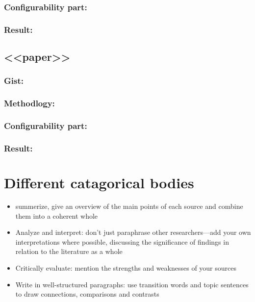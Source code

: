 \documentclass[	runningheads,
				a4paper]{llncs}
\begin{document}
\subsubsection{Configurability part:}

\subsubsection{Result:}


\subsection{<<paper>>}
\subsubsection{Gist:}

\subsubsection{Methodlogy:}

\subsubsection{Configurability part:}

\subsubsection{Result:}



\section{Different catagorical bodies}
\begin{itemize}
	\item summerize, give an overview of the main points of each source and combine them into a coherent whole
	\item Analyze and interpret: don’t just paraphrase other researchers—add your own interpretations where possible, discussing the significance of findings in relation to the literature as a whole
	\item Critically evaluate: mention the strengths and weaknesses of your sources
	\item Write in well-structured paragraphs: use transition words and topic sentences to draw connections, comparisons and contrasts
\end{itemize}
\end{document}
